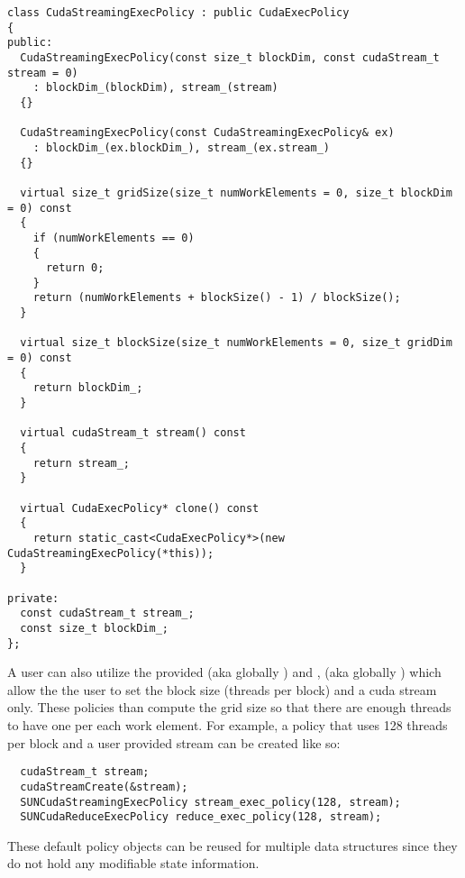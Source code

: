 \begin{verbatim}
class CudaStreamingExecPolicy : public CudaExecPolicy
{
public:
  CudaStreamingExecPolicy(const size_t blockDim, const cudaStream_t stream = 0)
    : blockDim_(blockDim), stream_(stream)
  {}

  CudaStreamingExecPolicy(const CudaStreamingExecPolicy& ex)
    : blockDim_(ex.blockDim_), stream_(ex.stream_)
  {} 

  virtual size_t gridSize(size_t numWorkElements = 0, size_t blockDim = 0) const
  {
    if (numWorkElements == 0)
    {
      return 0;
    }
    return (numWorkElements + blockSize() - 1) / blockSize();
  }

  virtual size_t blockSize(size_t numWorkElements = 0, size_t gridDim = 0) const
  {
    return blockDim_;
  }

  virtual cudaStream_t stream() const
  {
    return stream_;
  }

  virtual CudaExecPolicy* clone() const
  {
    return static_cast<CudaExecPolicy*>(new CudaStreamingExecPolicy(*this));
  }

private:
  const cudaStream_t stream_;
  const size_t blockDim_;
};
\end{verbatim}

A user can also utilize the provided 
(aka globally ) and ,
(aka globally ) which allow the the user to set the block size
(threads per block) and a cuda stream only. These policies than compute the grid size so
that there are enough threads to have one per each work element. For example, a policy that
uses 128 threads per block and a user provided stream can be created like so:

\begin{verbatim}
  cudaStream_t stream;
  cudaStreamCreate(&stream);
  SUNCudaStreamingExecPolicy stream_exec_policy(128, stream);
  SUNCudaReduceExecPolicy reduce_exec_policy(128, stream);
\end{verbatim}

These default policy objects can be reused for multiple {\sundials} data structures
since they do not hold any modifiable state information.